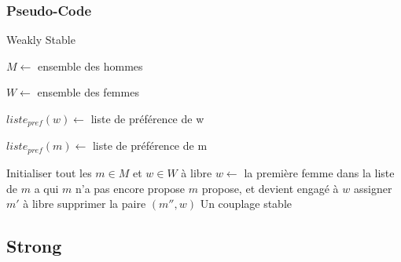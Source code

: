 \documentclass[11pt]{article}
\begin{document}
\subsubsection{Pseudo-Code}
\begin{algorithm}
\caption{Weakly Stable}
\begin{algorithmic} 
\REQUIRE 
\begin{list}{}{'}
	\item $M \leftarrow$ ensemble des hommes
	\item $W \leftarrow$ ensemble des femmes
    \item $liste_{pref}(w) \leftarrow$ liste de préférence de w 
    \item $liste_{pref}(m) \leftarrow$ liste de préférence de m
\end{list}

\STATE Initialiser tout les $m \in M$ et $w \in W$ à libre
\STATE $w \leftarrow$ la première femme dans la liste de $m$ a qui $m$ n'a pas
encore propose
\STATE $m$ propose, et devient engagé à $w$
\STATE assigner $m'$ à libre
\ENDIF
{}
\STATE supprimer la paire $(m'', w)$
\ENDFOR
\ENDWHILE
\ENSURE Un couplage stable
\end{algorithmic}
\end{algorithm}

\subsection{Strong}
\end{document}

